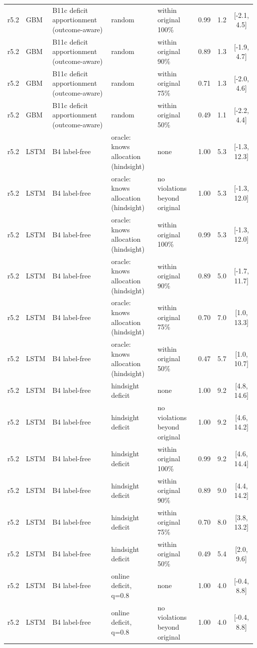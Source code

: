 \documentclass[10pt,onecolumn,letterpaper]{article}
\begin{document}
\begin{longtable}{lllp{4.2cm}p{3.4cm}ccc}
r5.2 & GBM & B11c deficit apportionment (outcome-aware) & random & within original 100\% & 0.99 & 1.2 & [-2.1, 4.5] \\
r5.2 & GBM & B11c deficit apportionment (outcome-aware) & random & within original 90\% & 0.89 & 1.3 & [-1.9, 4.7] \\
r5.2 & GBM & B11c deficit apportionment (outcome-aware) & random & within original 75\% & 0.71 & 1.3 & [-2.0, 4.6] \\
r5.2 & GBM & B11c deficit apportionment (outcome-aware) & random & within original 50\% & 0.49 & 1.1 & [-2.2, 4.4] \\
r5.2 & LSTM & B4 label-free & oracle: knows allocation (hindsight) & none & 1.00 & 5.3 & [-1.3, 12.3] \\
r5.2 & LSTM & B4 label-free & oracle: knows allocation (hindsight) & no violations beyond original & 1.00 & 5.3 & [-1.3, 12.0] \\
r5.2 & LSTM & B4 label-free & oracle: knows allocation (hindsight) & within original 100\% & 0.99 & 5.3 & [-1.3, 12.0] \\
r5.2 & LSTM & B4 label-free & oracle: knows allocation (hindsight) & within original 90\% & 0.89 & 5.0 & [-1.7, 11.7] \\
r5.2 & LSTM & B4 label-free & oracle: knows allocation (hindsight) & within original 75\% & 0.70 & 7.0 & [1.0, 13.3] \\
r5.2 & LSTM & B4 label-free & oracle: knows allocation (hindsight) & within original 50\% & 0.47 & 5.7 & [1.0, 10.7] \\
r5.2 & LSTM & B4 label-free & hindsight deficit & none & 1.00 & 9.2 & [4.8, 14.6] \\
r5.2 & LSTM & B4 label-free & hindsight deficit & no violations beyond original & 1.00 & 9.2 & [4.6, 14.2] \\
r5.2 & LSTM & B4 label-free & hindsight deficit & within original 100\% & 0.99 & 9.2 & [4.6, 14.4] \\
r5.2 & LSTM & B4 label-free & hindsight deficit & within original 90\% & 0.89 & 9.0 & [4.4, 14.2] \\
r5.2 & LSTM & B4 label-free & hindsight deficit & within original 75\% & 0.70 & 8.0 & [3.8, 13.2] \\
r5.2 & LSTM & B4 label-free & hindsight deficit & within original 50\% & 0.49 & 5.4 & [2.0, 9.6] \\
r5.2 & LSTM & B4 label-free & online deficit, q=0.8 & none & 1.00 & 4.0 & [-0.4, 8.8] \\
r5.2 & LSTM & B4 label-free & online deficit, q=0.8 & no violations beyond original & 1.00 & 4.0 & [-0.4, 8.8] \\

\end{longtable}
\end{document}
